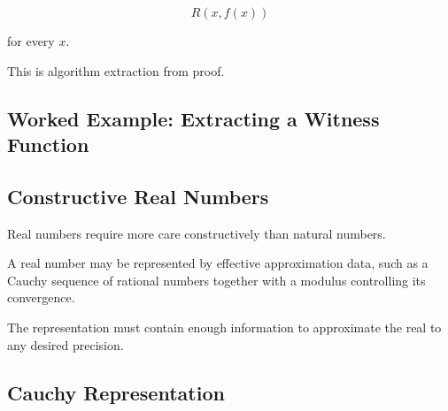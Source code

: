 \[
\boxed{
R(x,f(x))
}
\]

for every \(x\).

This is algorithm extraction from proof.

\subsection{Worked Example: Extracting a Witness Function}
\label{subsec:worked-witness-function}


\subsection{Constructive Real Numbers}
\label{subsec:constructive-real-numbers}

Real numbers require more care constructively than natural numbers.

A real number may be represented by effective approximation data, such as a
Cauchy sequence of rational numbers together with a modulus controlling its
convergence.

The representation must contain enough information to approximate the real
to any desired precision.

\subsection{Cauchy Representation}
\label{subsec:constructive-cauchy-representation}

